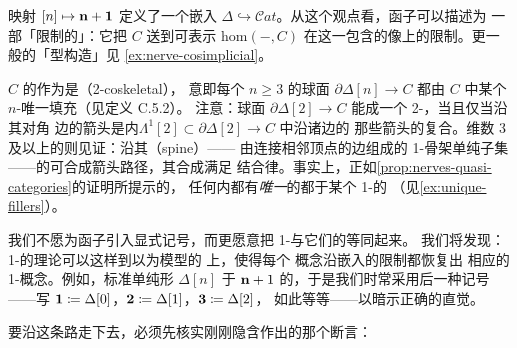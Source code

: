 映射 $[n]\mapsto\mathbf{n}+\mathbf{1}$ 定义了一个\trFullyFaithful{}嵌入
$\Delta\hookrightarrow\mathcal{C}at$。从这个观点看，\trNerve{}函子可以描述为
一部「限制的\trYonedaEmbedding」：它把\trCategory{} $C$ 送到可表示\trFunctor
$\mathrm{hom}(-,C)$ 在这一包含的像上的限制。更一般的「\trNerve{}型构造」见
\cref{ex:nerve-cosimplicial}。

\begin{remark}\label{rem:nerve-2-coskeletal}
\trCategory{} $C$ 的\trNerve{}作为\trSimplicialSet{}是\textbf{\trTwoCoskeletal}（2-coskeletal），
意即每个 $n\ge 3$ 的球面 $\partial\Delta[n]\to C$ 都由 $C$ 中某个
$n$-\trSimplex{}唯一填充（见定义 C.5.2）。%
注意：球面 $\partial\Delta[2]\to C$ 能\trExtension{}成一个 2-\trSimplex{}，当且仅当沿其对角
边的箭头是内\trHorn $\Lambda^1[2]\subset\partial\Delta[2]\to C$ 中沿诸边的
那些箭头的复合。维数 3 及以上的\trSimplex{}则见证：沿其\textbf{\trSpine}（spine）——
由连接相邻顶点的边组成的 1-骨架单纯子集——的可合成箭头路径，其合成满足
结合律。事实上，正如\cref{prop:nerves-quasi-categories}的证明所提示的，
任何内\trHorn{}都有\emph{唯一}\trFiller{}的\trSimplicialSet{}都\trIsomorphism{}于某个 1-\trCategory{}的\trNerve
（见\cref{ex:unique-fillers}）。
\end{remark}

我们不愿为\trNerve{}函子引入显式记号，而更愿意把 1-\trCategory{}与它们的\trNerve{}等同起来。
我们将发现：1-\trCategory{}的理论可以这样\trExtension{}到以\trQuasiCategory{}为模型的%
\trInfinityCategory{}上，使得每个 \trInfinityCategory{}概念沿\trNerve{}嵌入的限制都恢复出
相应的 1-\trCategory{}概念。例如，标准单纯形 $\Delta[n]$ \trIsomorphism{}于\trOrdinalCategory
$\mathbf{n}+1$ 的\trNerve{}，于是我们时常采用后一种记号——写
$\mathbf{1}\coloneqq\Delta[0]$，$\mathbf{2}\coloneqq\Delta[1]$，$\mathbf{3}\coloneqq\Delta[2]$，
如此等等——以暗示正确的\trCategory{}直觉。

要沿这条路走下去，必须先核实刚刚隐含作出的那个断言：

